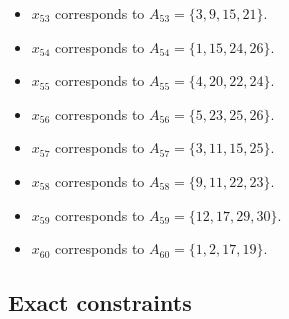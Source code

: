 \documentclass[11pt]{article}
\begin{document}
\begin{itemize}
\item $x_{53}$ corresponds to $A_{53}=\{3, 9, 15, 21\}$.
\item $x_{54}$ corresponds to $A_{54}=\{1, 15, 24, 26\}$.
\item $x_{55}$ corresponds to $A_{55}=\{4, 20, 22, 24\}$.
\item $x_{56}$ corresponds to $A_{56}=\{5, 23, 25, 26\}$.
\item $x_{57}$ corresponds to $A_{57}=\{3, 11, 15, 25\}$.
\item $x_{58}$ corresponds to $A_{58}=\{9, 11, 22, 23\}$.
\item $x_{59}$ corresponds to $A_{59}=\{12, 17, 29, 30\}$.
\item $x_{60}$ corresponds to $A_{60}=\{1, 2, 17, 19\}$.
\end{itemize}
\subsection*{Exact constraints}
\end{document}
